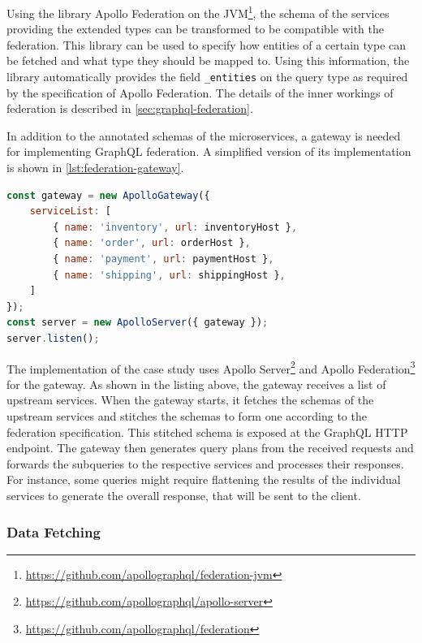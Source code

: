Using the library Apollo Federation on the \ac{JVM}\footnote{\url{https://github.com/apollographql/federation-jvm}}, the schema of the services providing the extended types can be transformed to be compatible with the federation.
This library can be used to specify how entities of a certain type can be fetched and what type they should be mapped to.
Using this information, the library automatically provides the field \texttt{\_entities} on the query type as required by the specification of Apollo Federation.
The details of the inner workings of federation is described in \autoref{sec:graphql-federation}.

In addition to the annotated schemas of the microservices, a gateway is needed for implementing GraphQL federation.
A simplified version of its implementation is shown in \autoref{lst:federation-gateway}. 

\begin{lstlisting}[caption={Implementation of the GraphQL Gateway}, language=javascript, label={lst:federation-gateway}]
const gateway = new ApolloGateway({
    serviceList: [
        { name: 'inventory', url: inventoryHost },
        { name: 'order', url: orderHost },
        { name: 'payment', url: paymentHost },
        { name: 'shipping', url: shippingHost },
    ]
});
const server = new ApolloServer({ gateway });
server.listen();
\end{lstlisting}

The implementation of the case study uses Apollo Server\footnote{\url{https://github.com/apollographql/apollo-server}} and Apollo Federation\footnote{\url{https://github.com/apollographql/federation}} for the gateway.
As shown in the listing above, the gateway receives a list of upstream services.
When the gateway starts, it fetches the schemas of the upstream services and stitches the schemas to form one according to the federation specification.
This stitched schema is exposed at the GraphQL \ac{HTTP} endpoint.
The gateway then generates query plans from the received requests and forwards the subqueries to the respective services and processes their responses.
For instance, some queries might require flattening the results of the individual services to generate the overall response, that will be sent to the client.

\subsubsection{Data Fetching}\label{sec:graphql-data-fetching}

